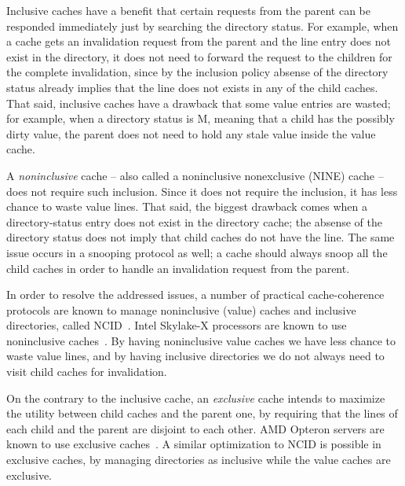 Inclusive caches have a benefit that certain requests from the parent can be responded immediately just by searching the directory status.
For example, when a cache gets an invalidation request from the parent and the line entry does not exist in the directory, it does not need to forward the request to the children for the complete invalidation, since by the inclusion policy absense of the directory status already implies that the line does not exists in any of the child caches.
That said, inclusive caches have a drawback that some value entries are wasted; for example, when a directory status is M, meaning that a child has the possibly dirty value, the parent does not need to hold any stale value inside the value cache.

A \emph{noninclusive} cache -- also called a noninclusive nonexclusive (NINE) cache -- does not require such inclusion.
Since it does not require the inclusion, it has less chance to waste value lines.
That said, the biggest drawback comes when a directory-status entry does not exist in the directory cache; the absense of the directory status does not imply that child caches do not have the line.
The same issue occurs in a snooping protocol as well; \eg{} a cache should always snoop all the child caches in order to handle an invalidation request from the parent.

In order to resolve the addressed issues, a number of practical cache-coherence protocols are known to manage noninclusive (value) caches and inclusive directories, called NCID~\cite{Zhao:2010}.
Intel Skylake-X processors are known to use noninclusive caches~\cite{intel-non-inclusive,Yan:2019}.
By having noninclusive value caches we have less chance to waste value lines, and by having inclusive directories we do not always need to visit child caches for invalidation.

On the contrary to the inclusive cache, an \emph{exclusive} cache intends to maximize the utility between child caches and the parent one, by requiring that the lines of each child and the parent are disjoint to each other.
AMD Opteron servers are known to use exclusive caches~\cite{Irazoqui:2016}.
A similar optimization to NCID is possible in exclusive caches, by managing directories as inclusive while the value caches are exclusive.
